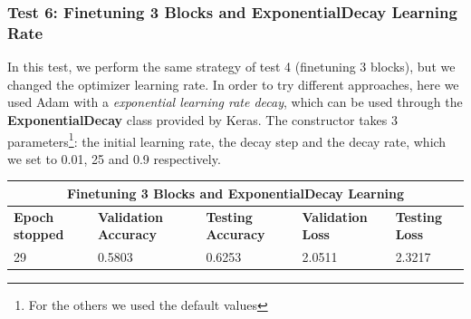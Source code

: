 \subsubsection{Test 6: Finetuning 3 Blocks and ExponentialDecay Learning Rate}
In this test, we perform the same strategy of test 4 (finetuning 3 blocks), but we changed the optimizer learning rate. In order to try different approaches, here we used Adam with a \textit{exponential learning rate decay}, which can be used through the \textbf{ExponentialDecay} class provided by Keras. The constructor takes 3 parameters\footnote{For the others we used the default values}: the initial learning rate, the decay step and the decay rate, which we set to 0.01, 25 and 0.9 respectively. 

\medskip
\begin{tabular}{ |p{2cm}|p{2cm}|p{2cm}|p{2cm}|p{2cm}|  }
\hline
\multicolumn{5}{|c|}{Finetuning 3 Blocks and ExponentialDecay Learning } \\
\hline
\textbf{Epoch stopped} & \textbf{Validation Accuracy} & \textbf{Testing Accuracy} & \textbf{Validation Loss} & \textbf{Testing Loss} \\
\hline
29 & 0.5803 & 0.6253 & 2.0511 & 2.3217\\
\hline
\end{tabular}

